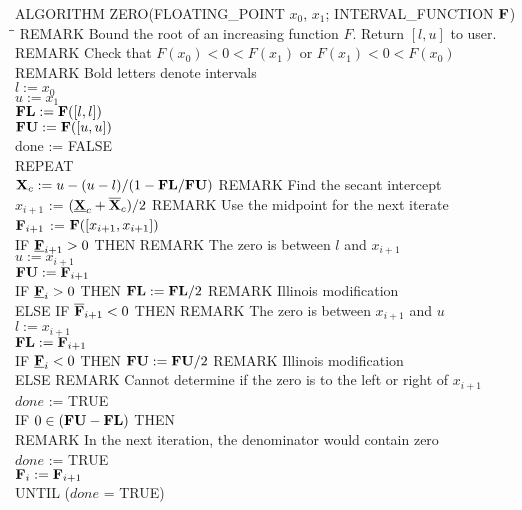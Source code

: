 \documentclass[10pt,letterpaper]{article}
\begin{document}
\begin{tabbing}
ALGORITHM ZERO(FLOATING\_POINT $x_0$, $x_1$; INTERVAL\_FUNCTION ${\bf F}$) \\
\qquad \= \qquad \= \qquad \kill 
REMARK Bound the root of an increasing function $F$.  Return $[l,u]$ to user. \\
REMARK Check that $F(x_0) < 0 < F(x_1)$ or $F(x_1) < 0 < F(x_0)$ \\
REMARK Bold letters denote intervals \\
$l := x_0$ \\
$u := x_1$ \\
${\bf FL} := {\bf F}([l,l])$ \\
${\bf FU} := {\bf F}([u,u])$ \\
done := FALSE \\
REPEAT \\
\> ${\bf X}_c := u - (u-l)/(1-{\bf FL}/{\bf FU})$ 
   \quad REMARK Find the secant intercept\\
\> $x_{i+1}$ := $(\underline{{\bf X}}_c + \overline{{\bf X}}_c) / 2$  \quad
REMARK Use the midpoint for the next iterate  \\
\> ${\bf F}_{i+1}$ := ${\bf F}([x_{i+1},x_{i+1}])$    \\
\> IF $\underline{{\bf F}}_{i+1} > 0 $ THEN  REMARK The zero is between $l$ and $x_{i+1}$ \\
\> \> $ u := x_{i+1}  $  \\
\> \> $ {\bf FU} := {\bf F}_{i+1} $    \\
\> \> IF $\underline{{\bf F}}_i > 0$  THEN  ${\bf FL} := {\bf FL} / 2 $  
        \quad REMARK Illinois modification  \\
\> ELSE IF $\overline{{\bf F}}_{i+1} < 0 $ THEN   REMARK The zero is between $x_{i+1}$ and $u$ \\
\> \> $ l := x_{i+1} $   \\
\> \> $ {\bf FL} := {\bf F}_{i+1} $    \\
\> \> IF $\underline{{\bf F}}_i < 0$ THEN $ {\bf FU} := {\bf FU} / 2 $   
        \quad REMARK Illinois modification  \\
\> ELSE    REMARK Cannot determine if the zero is to the left or 
         right of $x_{i+1}$ \\
\> \> $done$ := TRUE    \\
\> IF $ 0 \in ({\bf FU} - {\bf FL}) $ THEN \\
\> \> REMARK In the next iteration, the denominator would contain zero \\
\> \> $done$ := TRUE \\
\> ${\bf F}_i := {\bf F}_{i+1} $ \\
UNTIL ($done$ = TRUE) \\


\end{tabbing}
\end{document}

